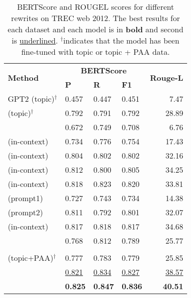 \begin{table}[hbt!]
\centering
\begin{tabular}{llll|r}
\hline
\multirow{2}{*}{\textbf{Method}} & \multicolumn{3}{c|}{\textbf{BERTScore}} & \multirow{2}{*}{\textbf{Rouge-L}} \\
\cmidrule(lr){2-4}
  & \textbf{P}     & \textbf{R}     & \textbf{F1}    &  \\
\hline

GPT2 (topic){$^\dagger$}                   & 0.457          & 0.447          & 0.451          & 7.47            \\
\bart{} (topic){$^\dagger$}        & 0.792          & 0.791          & 0.792          & 28.89           \\
\qd{}  & 0.672 & 0.749 & 0.708 & 6.76 \\
\ada{}  (in-context)         & 0.734          & 0.776          & 0.754            & 17.43            \\
\babbage{} (in-context)           & 0.804          & 0.802          & 0.802          & 32.16            \\
\curie{} (in-context)          & 0.812          & 0.800          & 0.805          & 34.25            \\
\davinci{} (in-context)           & 0.818         & 0.823          & 0.820        & 33.81            \\
\vinci{} (prompt1)            & 0.727          & 0.743          & 0.734          & 14.38          \\
\vinci{} (prompt2)            & 0.811          & 0.792          & 0.801          & 32.07           \\
\vinci{} (in-context)         & 0.817 & 0.818 & 0.817 & 34.68  \\
\chatgpt{}           & 0.768          & 0.812          & 0.789          & 25.77           \\
\hline
\multicolumn{5}{l}{\bf  \car{}} \\
\bart{} (topic+PAA){$^\dagger$}  & 0.777          & 0.783          & 0.779          & 25.85           \\
\vinci{} &\underline{0.821} & \underline{0.834} & \underline{0.827} & \underline{38.57}  \\
\chatgpt{} & \textbf{0.825} &  \textbf{0.847} &  \textbf{0.836} & \textbf{40.51}\\ \hline
\end{tabular}
\caption{BERTScore and ROUGEL scores for different rewrites on TREC web 2012. The best results for each dataset and each model is in \textbf{bold} and second is \underline{underlined}. {$^\dagger$}indicates that the model has been fine-tuned with topic or topic + PAA data.}
\label{tab:rewriter}
\end{table}